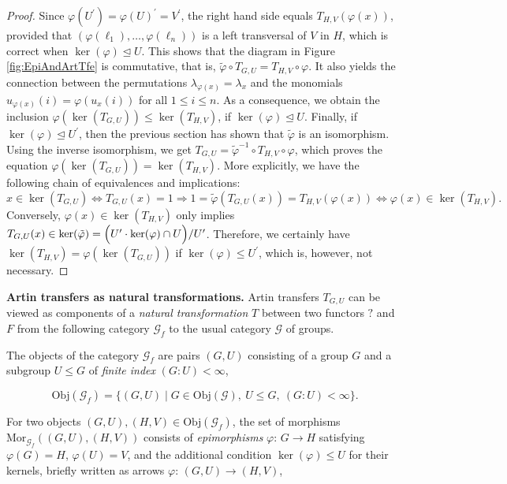 \documentclass{amsart}
\theoremstyle{definition}
\numberwithin{equation}{section}
\begin{document}
\begin{proof}
\noindent
Since \(\varphi(U^\prime)=\varphi(U)^\prime=V^\prime\),
the right hand side equals \(T_{H,V}(\varphi(x))\),
provided that \((\varphi(\ell_1),\ldots,\varphi(\ell_n))\) is a left transversal of \(V\) in \(H\),
which is correct when \(\ker(\varphi)\unlhd U\).
This shows that the diagram in Figure
\ref{fig:EpiAndArtTfe}
is commutative, that is,
\(\tilde{\varphi}\circ T_{G,U}=T_{H,V}\circ\varphi\).
It also yields the connection between the permutations \(\lambda_{\varphi(x)}=\lambda_x\) and
the monomials \(u_{\varphi(x)}(i)=\varphi(u_x(i))\) for all \(1\le i\le n\). 
As a consequence, we obtain the inclusion
\(\varphi(\ker(T_{G,U}))\le\ker(T_{H,V})\), if \(\ker(\varphi)\unlhd U\).
Finally, if \(\ker(\varphi)\unlhd U^\prime\),
then the previous section has shown that \(\tilde{\varphi}\) is an isomorphism.
Using the inverse isomorphism, we get
\(T_{G,U}=\tilde{\varphi}^{-1}\circ T_{H,V}\circ\varphi\),
which proves the equation \(\varphi(\ker(T_{G,U}))=\ker(T_{H,V})\).
More explicitly, we have the following chain of equivalences and implications:
\[x\in\ker(T_{G,U}) \Longleftrightarrow T_{G,U}(x)=1
\Longrightarrow 1=\tilde{\varphi}(T_{G,U}(x))=T_{H,V}(\varphi(x))
\Longleftrightarrow \varphi(x)\in\ker(T_{H,V}).\]
Conversely, \(\varphi(x)\in\ker(T_{H,V})\) only implies
\(T_{G,U}(x)\in\ker(\tilde{\varphi})=\Bigl(U^\prime\cdot\ker(\varphi)\cap U\Bigr)/U^\prime\).
Therefore, we certainly have \(\ker(T_{H,V})=\varphi(\ker(T_{G,U}))\)
if \(\ker(\varphi)\le U^\prime\), which is, however, not necessary.
\end{proof}



\noindent
\textbf{Artin transfers as natural transformations.}
Artin transfers \(T_{G,U}\) can be viewed as components of a \textit{natural transformation} \(T\)
between two functors \(?\) and \(F\) from the following category \(\mathcal{G}_{f}\)
to the usual category \(\mathcal{G}\) of groups.

The objects of the category \(\mathcal{G}_{f}\) are pairs \((G,U)\)
consisting of a group \(G\) and a subgroup \(U\le G\) of \textit{finite index} \((G:U)<\infty\),

\begin{equation}
\label{eqn:ObjGFinInd}
\mathrm{Obj}(\mathcal{G}_{f})=\lbrace (G,U)\mid G\in\mathrm{Obj}(\mathcal{G}),\ U\le G,\ (G:U)<\infty\rbrace.
\end{equation}

For two objects \((G,U),(H,V)\in\mathrm{Obj}(\mathcal{G}_{f})\),
the set of morphisms \(\mathrm{Mor}_{\mathcal{G}_{f}}((G,U),(H,V))\)
consists of \textit{epimorphisms} \(\varphi:\,G\to H\) satisfying \(\varphi(G)=H\), \(\varphi(U)=V\),
and the additional condition \(\ker(\varphi)\le U\) for their kernels,
briefly written as arrows \(\varphi:\,(G,U)\to (H,V)\),
\end{document}

